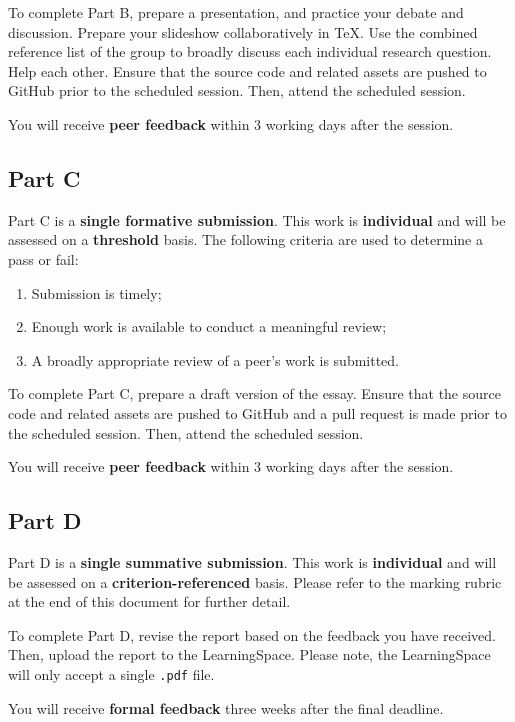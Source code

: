 \documentclass{../../fal_assignment}
\begin{document}
To complete Part B, prepare a presentation, and practice your debate and discussion. Prepare your slideshow collaboratively in TeX. Use the combined reference list of the group to broadly discuss each individual research question. Help each other. Ensure that the source code and related assets are pushed to GitHub prior to the scheduled session. Then, attend the scheduled session.

You will receive \textbf{peer feedback} within 3 working days after the session.

\subsection*{Part C}

Part C is a \textbf{single formative submission}. This work is \textbf{individual} and will be assessed on a \textbf{threshold} basis. The following criteria are used to determine a pass or fail:

\begin{enumerate}[label=(\alph*)]
	\item Submission is timely;
	\item Enough work is available to conduct a meaningful review;
	\item A broadly appropriate review of a peer's work is submitted.
\end{enumerate}

To complete Part C, prepare a draft version of the essay. Ensure that the source code and related assets are pushed to GitHub and a pull request is made prior to the scheduled session. Then, attend the scheduled session.

You will receive \textbf{peer feedback} within 3 working days after the session.

\subsection*{Part D}

Part D is a \textbf{single summative submission}. This work is \textbf{individual} and will be assessed on a \textbf{criterion-referenced} basis. Please refer to the marking rubric at the end of this document for further detail.

To complete Part D, revise the report based on the feedback you have received. Then, upload the report to the LearningSpace. Please note, the LearningSpace will only accept a single \texttt{.pdf} file.

You will receive \textbf{formal feedback} three weeks after the final deadline.
\end{document}
